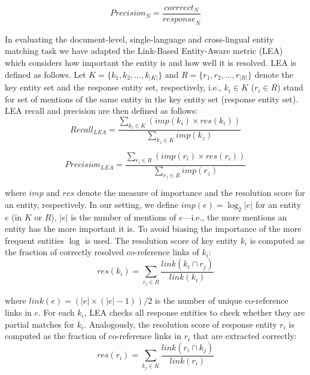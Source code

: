 \documentclass[11pt]{article}
\begin{document}
\begin{equation*}
	\mathit{Precision_{N}} = \frac{\mathit{corrrect}_{N}}{\mathit{response}_{N}}              
\end{equation*}


In evaluating the document-level, single-language and cross-lingual entity matching task we
have adapted the Link-Based Entity-Aware metric (LEA)~\cite{DBLP:conf-acl-Moosavi016} which
considers how important the entity is and how well it is resolved. 
%
LEA is defined as follows. 
%
Let $K = \{k_1,k_2,\ldots,k_{|K|} \}$ and $R = \{r_1,r_2,\ldots,r_{|R|} \}$ denote the key
entity set and the response entity set, respectively, i.e., $k_i \in K$ ($r_i \in R$) stand
for set of mentions of the same entity in the key entity set (response entity set). LEA recall
and precision are then defined as follows:
%
\begin{equation*}
	\mathit{\mathit{Recall}_{LEA}} = \frac{\sum_{k_{i} \in K} (\mathit{imp}(k_i) \times \mathit{res}(k_{i}))}
              {\sum_{k_{z} \in K} imp(k_{z})}
\end{equation*}

\begin{equation*}
	\mathit{\mathit{Precision}_{LEA}} = \frac{\sum_{r_{i} \in R} (\mathit{imp}(r_i) \times \mathit{res}(r_{i}))}
              {\sum_{r_{z} \in R} imp(r_{z})}
\end{equation*}

\noindent where $\mathit{imp}$ and $\mathit{res}$ denote the measure of importance and the
resolution score for an entity, respectively.  In our setting, we define
$\mathit{imp}(e) = \log_{2}|e|$ for an entity $e$ (in $K$ or $R$), $|e|$ is the number of
mentions of $e$---i.e., the more mentions an entity has the more important it is.  To avoid
biasing the importance of the more frequent entities $\log$ is used.  The resolution score of
key entity $k_i$ is computed as the fraction of correctly resolved co-reference links of
$k_i$:
%
\begin{equation*}
	\mathit{res}(k_i) = \sum_{r_{j} \in R} \frac{\mathit{link}(k_{i} \cap r_{j})}{\mathit{link}(k_{i})}
\end{equation*}

\noindent where $\mathit{link}(e) = (|e| \times (|e|-1))/2$ is the number
of unique co-reference links in $e$.  For each $k_i$, LEA checks all
response entities to check whether they are partial matches for
$k_i$. Analogously, the resolution score of response entity $r_i$ is
computed as the fraction of co-reference links in $r_i$ that are
extracted correctly:
%
\begin{equation*}
	\mathit{res}(r_i) = \sum_{k_{j} \in K} \frac{\mathit{link}(r_{i} \cap k_{j})}{\mathit{link}(r_{i})}
\end{equation*}
\end{document}
